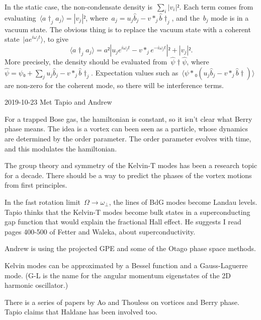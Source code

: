 In the static case, the non-condensate density is~$∑_i|v_i|²$.  Each term comes from evaluating~$〈a†_ja_j〉=|v_j|²$, where~$a_j=u_j\hat b_j-v*_j\hat b†_j$, and the~$b_j$ mode is in a vacuum state.  The obvious thing is to replace the vacuum state with a coherent state~$|ae^{iω_jt}〉$, to give
$$〈a†_ja_j〉=a²|u_je^{iω_jt}-v*_je^{-iω_jt}|²+|v_j|².$$
More precisely, the density should be evaluated from~$\hat ψ†\hat ψ$, where~$\hat ψ=ψ₀+∑_ju_j\hat b_j-v*_j\hat b†_j$.  Expectation values such as~$〈ψ*₀(u_j\hat b_j-v*_j\hat b†)〉$ are non-zero for the coherent mode, so there will be interference terms.

2019-10-23 Met Tapio and Andrew

For a trapped Bose gas, the hamiltonian is constant, so it isn't clear what Berry phase means.  The idea is a vortex can been seen as a particle, whose dynamics are determined by the order parameter.  The order parameter evolves with time, and this modulates the hamiltonian.

The group theory and symmetry of the Kelvin-T modes has been a research topic for a decade.  There should be a way to predict the phases of the vortex motions from first principles.

In the fast rotation limit~$Ω→ω_\perp$, the lines of BdG modes become Landau levels.  Tapio thinks that the Kelvin-T modes become bulk states in a superconducting gap function that would explain the fractional Hall effect.  He suggests I read pages 400-500 of Fetter and Waleka, about superconductivity.

Andrew is using the projected GPE and some of the Otago phase space methods.

Kelvin modes can be approximated by a Bessel function and a Gauss-Laguerre mode.  (G-L is the name for the angular momentum eigenstates of the 2D harmonic oscillator.)

There is a series of papers by Ao and Thouless on vortices and Berry phase.  Tapio claims that Haldane has been involved too.

\bye
